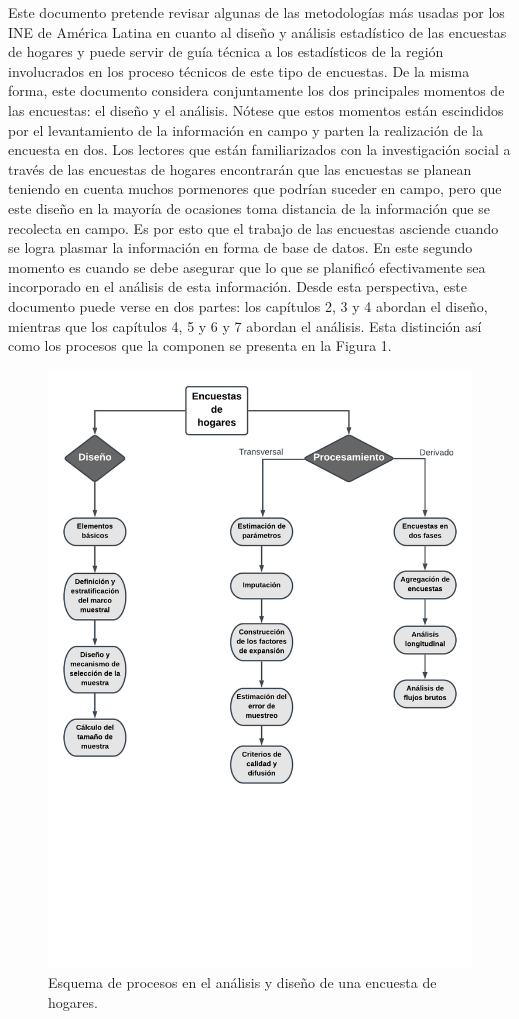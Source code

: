 \documentclass[
  12pt,
  spanish,
]{book}
\begin{document}
Este documento pretende revisar algunas de las metodologías más usadas por los INE de América Latina en cuanto al diseño y análisis estadístico de las encuestas de hogares y puede servir de guía técnica a los estadísticos de la región involucrados en los proceso técnicos de este tipo de encuestas. De la misma forma, este documento considera conjuntamente los dos principales momentos de las encuestas: el diseño y el análisis. Nótese que estos momentos están escindidos por el levantamiento de la información en campo y parten la realización de la encuesta en dos. Los lectores que están familiarizados con la investigación social a través de las encuestas de hogares encontrarán que las encuestas se planean teniendo en cuenta muchos pormenores que podrían suceder en campo, pero que este diseño en la mayoría de ocasiones toma distancia de la información que se recolecta en campo. Es por esto que el trabajo de las encuestas asciende cuando se logra plasmar la información en forma de base de datos. En este segundo momento es cuando se debe asegurar que lo que se planificó efectivamente sea incorporado en el análisis de esta información. Desde esta perspectiva, este documento puede verse en dos partes: los capítulos 2, 3 y 4 abordan el diseño, mientras que los capítulos 4, 5 y 6 y 7 abordan el análisis. Esta distinción así como los procesos que la componen se presenta en la Figura 1.

\begin{figure}
\centering
\includegraphics{Pics/1.pdf}
\caption{Esquema de procesos en el análisis y diseño de una encuesta de hogares.}
\end{figure}
\end{document}
